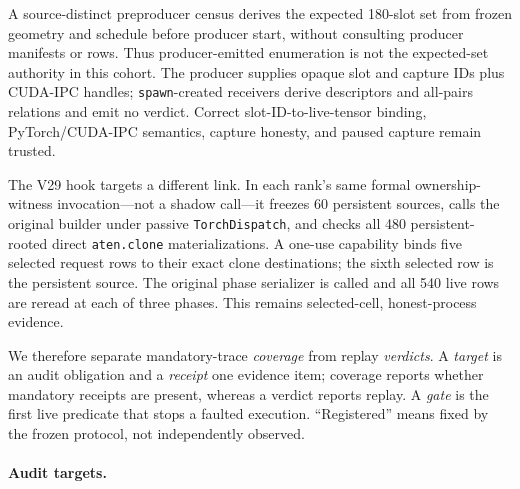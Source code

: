 \documentclass{article}
\begin{document}
A source-distinct preproducer census derives the expected 180-slot set from
frozen geometry and schedule before producer start, without consulting
producer manifests or rows.  Thus producer-emitted enumeration is not the
expected-set authority in this cohort.  The producer supplies opaque slot and
capture IDs plus CUDA-IPC handles; \texttt{spawn}-created receivers derive descriptors
and all-pairs relations and emit no verdict.  Correct slot-ID-to-live-tensor
binding, PyTorch/CUDA-IPC semantics, capture honesty, and paused capture remain
trusted.

The V29 hook targets a different link.  In each rank's same formal
ownership-witness invocation---not a shadow call---it freezes 60 persistent
sources, calls the original builder under passive \texttt{TorchDispatch}, and
checks all 480 persistent-rooted direct \texttt{aten.clone} materializations.
A one-use capability binds five selected request rows to their exact clone
destinations; the sixth selected row is the persistent source.  The original
phase serializer is called and all 540 live rows are reread at each of three
phases.  This remains selected-cell, honest-process evidence.

We therefore separate mandatory-trace \emph{coverage} from replay
\emph{verdicts}.  A \emph{target} is an audit obligation and a \emph{receipt} one
evidence item; coverage reports whether mandatory receipts are present, whereas
a verdict reports replay.  A \emph{gate} is the first live predicate that stops
a faulted execution.  ``Registered'' means fixed by the frozen protocol, not
independently observed.

\paragraph{Audit targets.}
\end{document}
